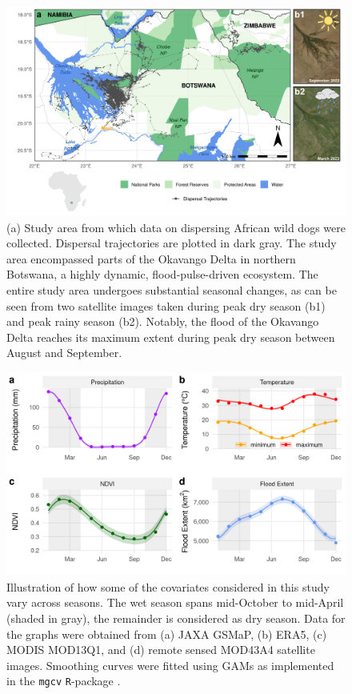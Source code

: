 \documentclass[../FinalThesis.tex]{subfiles}
\begin{document}
\begin{figure}[htpb]
 \begin{center}
  \includegraphics[width = \textwidth]{Figures/StudyArea.png} \caption{(a) Study
  area from which data on dispersing African wild dogs were collected. Dispersal
  trajectories are plotted in dark gray. The study area encompassed parts of the
  Okavango Delta in northern Botswana, a highly dynamic, flood-pulse-driven
  ecosystem. The entire study area undergoes substantial seasonal changes, as
  can be seen from two satellite images taken during peak dry season (b1) and
  peak rainy season (b2). Notably, the flood of the Okavango Delta reaches its
  maximum extent during peak dry season between August and September.}
  \label{StudyAreaCH3}
 \end{center}
\end{figure}

\begin{figure}[htpb]
\begin{center}
  \includegraphics[width = \textwidth]{Figures/SeasonalCovariates.png}
  \caption{Illustration of how some of the covariates considered in this study
  vary across seasons. The wet season spans mid-October to mid-April (shaded in
  gray), the remainder is considered as dry season. Data for the graphs were
  obtained from (a) JAXA GSMaP, (b) ERA5, (c) MODIS MOD13Q1, and (d) remote
  sensed MOD43A4 satellite images. Smoothing curves were fitted using GAMs as
  implemented in the \texttt{mgcv} \texttt{R}-package \citep{Wood.2011}.}
  \label{Seasonality}
\end{center}
\end{figure}
\end{document}
